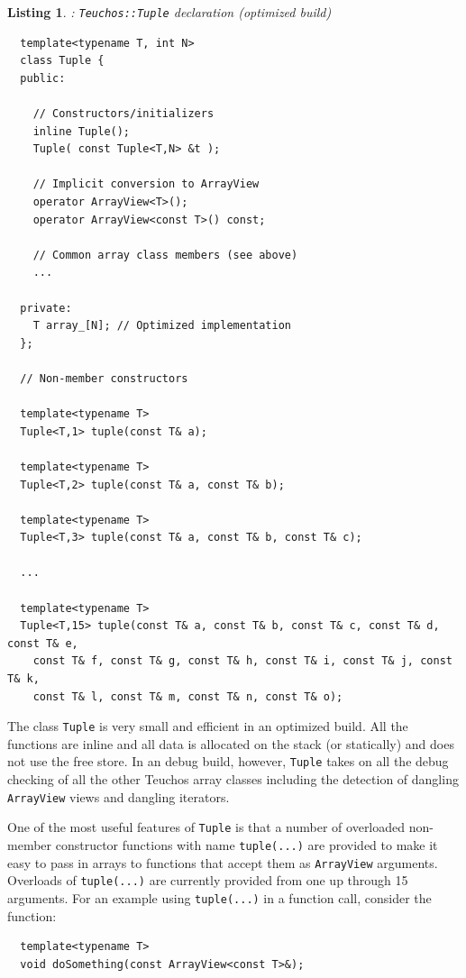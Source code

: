 \documentclass[pdf,ps2pdf,11pt]{SANDreport}
\newtheorem{listing}{Listing}
\begin{document}
\begin{listing}: {}\texttt{Teuchos::Tuple} declaration (optimized build) \\
\label{listing:Tuple}
{\small\begin{verbatim}
  template<typename T, int N>
  class Tuple {
  public:
    
    // Constructors/initializers
    inline Tuple();
    Tuple( const Tuple<T,N> &t );
  
    // Implicit conversion to ArrayView
    operator ArrayView<T>();
    operator ArrayView<const T>() const;
    
    // Common array class members (see above)
    ...
  
  private:
    T array_[N]; // Optimized implementation
  };
  
  // Non-member constructors
  
  template<typename T>
  Tuple<T,1> tuple(const T& a);
  
  template<typename T>
  Tuple<T,2> tuple(const T& a, const T& b);
  
  template<typename T>
  Tuple<T,3> tuple(const T& a, const T& b, const T& c);
  
  ...
  
  template<typename T>
  Tuple<T,15> tuple(const T& a, const T& b, const T& c, const T& d, const T& e,
    const T& f, const T& g, const T& h, const T& i, const T& j, const T& k,
    const T& l, const T& m, const T& n, const T& o);
\end{verbatim}}
\end{listing}

The class {}\texttt{Tuple} is very small and efficient in an optimized
build.  All the functions are inline and all data is allocated on the
stack (or statically) and does not use the free store.  In an debug
build, however, {}\texttt{Tuple} takes on all the debug checking of
all the other Teuchos array classes including the detection of
dangling {}\texttt{ArrayView} views and dangling iterators.

One of the most useful features of {}\texttt{Tuple} is that a number
of overloaded non-member constructor functions with name
{}\texttt{tuple(...)} are provided to make it easy to pass in arrays
to functions that accept them as {}\texttt{ArrayView} arguments.
Overloads of {}\texttt{tuple(...)} are currently provided from one up
through 15 arguments.  For an example using {}\texttt{tuple(...)} in a
function call, consider the function:

{\small\begin{verbatim}
  template<typename T>
  void doSomething(const ArrayView<const T>&);
\end{verbatim}}
\end{document}
